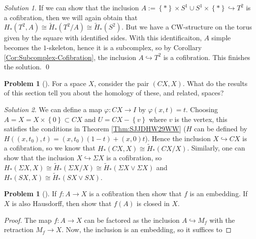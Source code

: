 \documentclass[reqno]{amsart}
\theoremstyle{definition}
\newtheorem{problem}[theorem]{Problem}
\theoremstyle{remark}
\newtheorem*{solution}{Solution}
\begin{document}
\begin{solution}
    If we can show that the inclusion
    $A:= \left\{ * \right\} \times S^{1} \cup 
    S^{1} \times \left\{ * \right\} \hookrightarrow
    T^2$ is a cofibration, then
    we will again obtain that
    $H_* (T^2, A) \cong
    \tilde{H}_* \left( T^2 / A \right) \cong
    \tilde{H}_* \left( S^2 \right) $.
    But we have a CW-structure on the
    torus given by the square with identified sides.
    With this identificaiton, $A$ simple becomes
    the $1$-skeleton, hence it is a subcomplex, so
    by Corollary \ref{Cor:Subcomplex-Cofibration}, 
    the inclusion $A \hookrightarrow T^2$ is a cofibration.
    This finishes the solution. \qed
\end{solution}

\begin{problem}[]
    For a space $X$, consider the pair
    $\left( CX, X \right) $. What do the results of this
    section tell you about the homology of these, and related,
    spaces?
\end{problem}


\begin{solution}
    We can define a map
    $\varphi \colon CX \to I$ by
    $\varphi (x,t) = t$. Choosing
    $A = X = X \times \left\{ 0 \right\} \subset 
    CX$ and
    $U = CX - \left\{ v \right\} $ where
    $v$ is the vertex, this satisfies the
    conditions in Theorem \ref{Thm:SJJDHW29WW} 
    ($H$ can be defined by
    $H((x,t_0),t) = \left( x,t_0 \right) (1-t)
    + (x,0) t$).
    Hence the inclusion
    $X \hookrightarrow CX$ is a cofibration, so we
    know that
    $H_* \left( CX, X \right) 
    \cong \tilde{H}_* \left( CX / X \right) $.
    Similarly, one can
    show that the inclusion
    $X \hookrightarrow \Sigma X$ is a cofibration, so
    $H_* \left( \Sigma X , X \right) 
    \cong \tilde{H}_* \left( \Sigma X / X \right) 
    \cong \tilde{H}_* \left( 
    \Sigma X \vee \Sigma X \right) $ and
    $H_*\left( SX, X \right) 
    \cong \tilde{H}_* \left( SX \vee SX \right) $.
\end{solution}


\begin{problem}[]
    If $f \colon A \to X$ is a cofibration then show that
    $f$ is an embedding. If $X$ is also Hausdorff,
    then show that $f(A)$ is closed in $X$.
\end{problem}

\begin{proof}
    The map
    $f \colon A \to X$ can be factored as
    the inclusion $A \hookrightarrow M_f$ with
    the retraction $M_f \to X$. Now, the
    inclusion is an embedding, so
    it suffices to
\end{proof}
\end{document}
